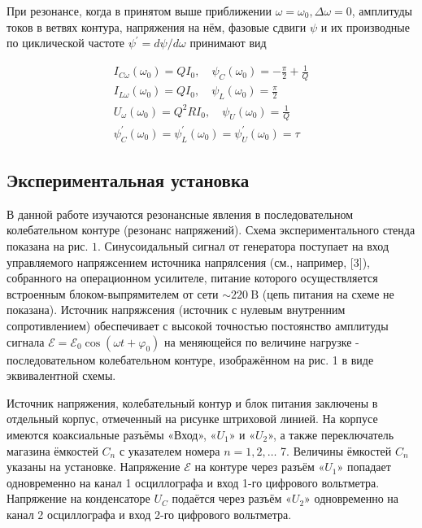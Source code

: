 \documentclass[a4paper, 12pt]{article}%
\begin{document}
При резонансе, когда в принятом выше приближении $\omega=\omega_{0}, \Delta \omega=0$, амплитуды токов в ветвях контура, напряжения на нём, фазовые сдвиги $\psi$ и их производные по циклической частоте $\psi^{\prime}=d \psi / d \omega$ принимают вид

\[
\begin{gathered}
I_{C \omega}\left(\omega_{0}\right)=Q I_{0}, \quad \psi_{C}\left(\omega_{0}\right)=-\frac{\pi}{2}+\frac{1}{Q} \\
I_{L \omega}\left(\omega_{0}\right)=Q I_{0}, \quad \psi_{L}\left(\omega_{0}\right)=\frac{\pi}{2} \\
U_{\omega}\left(\omega_{0}\right)=Q^{2} R I_{0}, \quad \psi_{U}\left(\omega_{0}\right)=\frac{1}{Q} \\
\psi_{C}^{\prime}\left(\omega_{0}\right)=\psi_{L}^{\prime}\left(\omega_{0}\right)=\psi_{U}^{\prime}\left(\omega_{0}\right)=\tau
\end{gathered}
\]

\subsection{Экспериментальная установка}

В данной работе изучаются резонансные явления в последовательном колебательном контуре (резонанс напряжений). Схема экспериментального стенда показана на рис. $1 .$ Синусоидальный сигнал от генератора поступает на вход управляемого напряжсением источника напрялсения (см., например, [3]), собранного на операционном усилителе, питание которого осуществляется встроенным блоком-выпрямителем от сети $\sim 220 \mathrm{~B}$ (цепь питания на схеме не показана). Источник напряжсения (источник с нулевым внутренним сопротивлением) обеспечивает с высокой точностью постоянство амплитуды сигнала $\mathcal{E}=\mathcal{E}_{0} \cos \left(\omega t+\varphi_{0}\right)$ на меняющейся по величине нагрузке - последовательном колебательном контуре, изображённом на рис. 1 в виде эквивалентной схемы.

Источник напряжения, колебательный контур и блок питания заключены в отдельный корпус, отмеченный на рисунке штриховой линией. На корпусе имеются коаксиальные разъёмы «Вход», «$U_1$» и «$U_{2}$», а также переключатель магазина ёмкостей $C_{n}$ с указателем номера $n=1,2, \ldots$ 7. Величины ёмкостей $C_{n}$ указаны на установке. Напряжение $\mathcal{E}$ на контуре через разъём «$U_1$» попадает одновременно на канал 1 осциллографа и вход 1-го цифрового вольтметра. Напряжение на конденсаторе $U_{C}$ подаётся через разъём «$U_2$» одновременно на канал 2 осциллографа и вход 2-го цифрового вольтметра.
\end{document}
